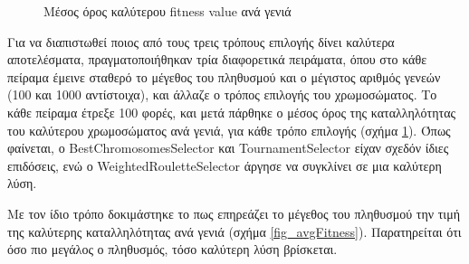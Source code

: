 \begin{figure}[!t]
    \centering
    \caption{Μέσος όρος καλύτερου fitness value ανά γενιά}
    \label{fig_selectorFitness}
\end{figure}

Για να διαπιστωθεί ποιος από τους τρεις τρόπους επιλογής δίνει καλύτερα αποτελέσματα, πραγματοποιήθηκαν τρία διαφορετικά πειράματα, όπου στο κάθε πείραμα έμεινε σταθερό το μέγεθος του πληθυσμού και ο μέγιστος αριθμός γενεών (100 και 1000 αντίστοιχα), και άλλαζε ο τρόπος επιλογής του χρωμοσώματος. Το κάθε πείραμα έτρεξε 100 φορές, και μετά πάρθηκε ο μέσος όρος της καταλληλότητας του καλύτερου χρωμοσώματος ανά γενιά, για κάθε τρόπο επιλογής (σχήμα \ref{fig_selectorFitness}). Όπως φαίνεται, ο BestChromosomesSelector και TournamentSelector είχαν σχεδόν ίδιες επιδόσεις, ενώ ο WeightedRouletteSelector άργησε να συγκλίνει σε μια καλύτερη λύση.

Με τον ίδιο τρόπο δοκιμάστηκε το πως επηρεάζει το μέγεθος του πληθυσμού την τιμή της καλύτερης καταλληλότητας ανά γενιά (σχήμα \ref{fig_avgFitness}). Παρατηρείται ότι όσο πιο μεγάλος ο πληθυσμός, τόσο καλύτερη λύση βρίσκεται.

